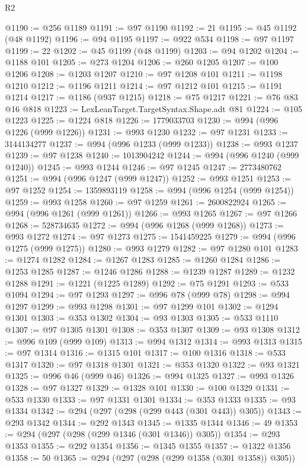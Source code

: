 \begin{lexlean}{R2}
\begin{coremodule}
@1190 := @256 @1189
@1191 := @97 @1190
@1192 := 21
@1195 := @45 @1192 (@48 @1192)
@1196 := @94 @1195
@1197 := @922 @534
@1198 := @97 @1197
@1199 := 22
@1202 := @45 @1199 (@48 @1199)
@1203 := @94 @1202
@1204 := @1188 @101
@1205 := @273 @1204
@1206 := @260 @1205
@1207 := @100 @1206
@1208 := @1203 @1207
@1210 := @97 @1208 @101
@1211 := @1198 @1210
@1212 := @1196 @1211
@1214 := @97 @1212 @101
@1215 := @1191 @1214
@1217 := @1186 (@937 @1215)
@1218 := @75 @1217
@1221 := @76 @83 @16 @818
@1223 := LexLeanTarget.TargetSyntax.Shape.adt @81
@1224 := @105 @1223
@1225 := @1224 @818
@1226 := 1779033703
@1230 := @994 (@996 @1226 (@999 @1226))
@1231 := @993 @1230
@1232 := @97 @1231
@1233 := 3144134277
@1237 := @994 (@996 @1233 (@999 @1233))
@1238 := @993 @1237
@1239 := @97 @1238
@1240 := 1013904242
@1244 := @994 (@996 @1240 (@999 @1240))
@1245 := @993 @1244
@1246 := @97 @1245
@1247 := 2773480762
@1251 := @994 (@996 @1247 (@999 @1247))
@1252 := @993 @1251
@1253 := @97 @1252
@1254 := 1359893119
@1258 := @994 (@996 @1254 (@999 @1254))
@1259 := @993 @1258
@1260 := @97 @1259
@1261 := 2600822924
@1265 := @994 (@996 @1261 (@999 @1261))
@1266 := @993 @1265
@1267 := @97 @1266
@1268 := 528734635
@1272 := @994 (@996 @1268 (@999 @1268))
@1273 := @993 @1272
@1274 := @97 @1273
@1275 := 1541459225
@1279 := @994 (@996 @1275 (@999 @1275))
@1280 := @993 @1279
@1282 := @97 @1280 @101
@1283 := @1274 @1282
@1284 := @1267 @1283
@1285 := @1260 @1284
@1286 := @1253 @1285
@1287 := @1246 @1286
@1288 := @1239 @1287
@1289 := @1232 @1288
@1291 := @1221 (@1225 @1289)
@1292 := @75 @1291
@1293 := @533 @1094
@1294 := @97 @1293
@1297 := @996 @78 (@999 @78)
@1298 := @994 @1297
@1299 := @993 @1298
@1301 := @97 @1299 @101
@1302 := @1294 @1301
@1303 := @353 @1302
@1304 := @93 @1303
@1305 := @533 @1110
@1307 := @97 @1305 @1301
@1308 := @353 @1307
@1309 := @93 @1308
@1312 := @996 @109 (@999 @109)
@1313 := @994 @1312
@1314 := @993 @1313
@1315 := @97 @1314
@1316 := @1315 @101
@1317 := @100 @1316
@1318 := @533 @1317
@1320 := @97 @1318 @1301
@1321 := @353 @1320
@1322 := @93 @1321
@1325 := @996 @46 (@999 @46)
@1326 := @994 @1325
@1327 := @993 @1326
@1328 := @97 @1327
@1329 := @1328 @101
@1330 := @100 @1329
@1331 := @533 @1330
@1333 := @97 @1331 @1301
@1334 := @353 @1333
@1335 := @93 @1334
@1342 := @294 (@297 (@298 (@299 @443 (@301 @443)) @305))
@1343 := @293 @1342
@1344 := @292 @1343
@1345 := @1335 @1344
@1346 := 49
@1353 := @294 (@297 (@298 (@299 @1346 (@301 @1346)) @305))
@1354 := @293 @1353
@1355 := @292 @1354
@1356 := @1345 @1355
@1357 := @1322 @1356
@1358 := 50
@1365 := @294 (@297 (@298 (@299 @1358 (@301 @1358)) @305))

\end{coremodule}
\end{lexlean}

